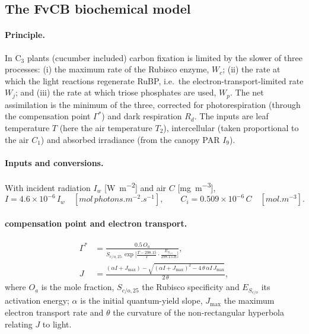 \documentclass[11pt,a4paper]{article}
\newcommand{\Tair}{T_{2}}
\newcommand{\Cair}{C_{1}}
\begin{document}
\subsection{The FvCB biochemical model}
\paragraph{Principle.} In C$_3$ plants (cucumber included) carbon fixation is limited by the slower
of three processes: (i) the maximum rate of the Rubisco enzyme, $W_c$; (ii) the rate at which the
light reactions regenerate RuBP, i.e.\ the electron-transport-limited rate $W_j$; and (iii) the rate
at which triose phosphates are used, $W_p$. The net assimilation is the minimum of the three,
corrected for photorespiration (through the  compensation point $\Gamma^{\!*}$) and dark
respiration $R_d$. The inputs are leaf temperature $T$ (here the air temperature $\Tair$),
intercellular  (taken proportional to the air  $\Cair$) and absorbed irradiance
(from the canopy PAR $I_9$).

\paragraph{Inputs and conversions.} With incident radiation $I_w$ [\si{W.m^{-2}}] and air 
$C$ [\si{mg.m^{-3}}],
\begin{equation}
  I = 4.6\times10^{-6}\,I_w \quad[\si{mol\,photons.m^{-2}.s^{-1}}], \qquad
  C_i = 0.509\times10^{-6}\,C \quad[\si{mol.m^{-3}}].
\end{equation}
\paragraph{ compensation point and electron transport.}
\begin{align}
  \Gamma^{\!*} &= \frac{0.5\,O_a}{S_{c/o,25}\,\exp\!\big[\tfrac{T-298.15}{T}\cdot\tfrac{E_{S_{c/o}}}{298.15\,R}\big]},\\
  J &= \frac{(\alpha I + J_{\max}) - \sqrt{(\alpha I + J_{\max})^2 - 4\,\theta\,\alpha I\,J_{\max}}}{2\,\theta},
\end{align}
where $O_a$ is the  mole fraction, $S_{c/o,25}$ the Rubisco specificity and $E_{S_{c/o}}$ its
activation energy; $\alpha$ is the initial quantum-yield slope, $J_{\max}$ the maximum electron
transport rate and $\theta$ the curvature of the non-rectangular hyperbola relating $J$ to light.
\end{document}
